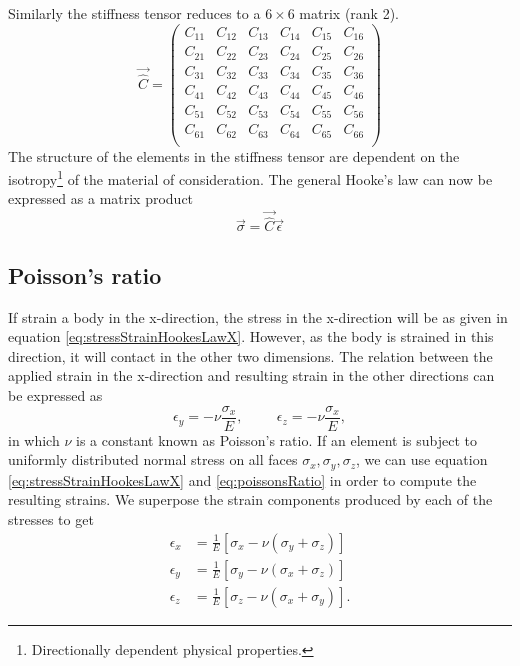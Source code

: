 \documentclass[twoside,english]{uiofysmaster}
\begin{document}
Similarly the stiffness tensor reduces to a $6\times6$ matrix (rank 2).
\begin{equation}
\vec{\hat{C}} = \begin{pmatrix}
C_{11}& C_{12}& C_{13}& C_{14}& C_{15}& C_{16} \\
C_{21}& C_{22}& C_{23}& C_{24}& C_{25}& C_{26} \\
C_{31}& C_{32}& C_{33}& C_{34}& C_{35}& C_{36} \\
C_{41}& C_{42}& C_{43}& C_{44}& C_{45}& C_{46} \\
C_{51}& C_{52}& C_{53}& C_{54}& C_{55}& C_{56} \\
C_{61}& C_{62}& C_{63}& C_{64}& C_{65}& C_{66} \\
\end{pmatrix}
\end{equation} 
The structure of the elements in the stiffness tensor are dependent on the isotropy\footnote{Directionally dependent physical properties.} of the material of consideration.
The general Hooke's law can now be expressed as a matrix product
\begin{equation}
\vec{\sigma} = \vec{\hat{C}}\vec{\epsilon}
\end{equation}

\subsection{Poisson's ratio}
If strain a body in the x-direction, the stress in the x-direction will be as given in equation \eqref{eq:stressStrainHookesLawX}. However, as the body is strained in this direction, it will contact in the other two dimensions. 
The relation between the applied strain in the x-direction and resulting strain in the other directions can be expressed as 
\begin{equation}
\epsilon_y = -\nu\frac{\sigma_x}{E}, \hspace{1cm} \epsilon_z = -\nu\frac{\sigma_x}{E} , \label{eq:poissonsRatio}
\end{equation}
in which $\nu$ is a constant known as Poisson's ratio. 
If an element is subject to uniformly distributed normal stress on all faces $\sigma_x,\sigma_y,\sigma_z$, we can use equation \eqref{eq:stressStrainHookesLawX} and \eqref{eq:poissonsRatio} in order to compute the resulting strains. 
We superpose the strain components produced by each of the stresses to get
\begin{align}
\epsilon_x &= \frac{1}{E}[\sigma_x - \nu(\sigma_y + \sigma_z)]\\[2mm]
\epsilon_y &= \frac{1}{E}[\sigma_y - \nu(\sigma_x + \sigma_z)]\\[2mm]
\epsilon_z &= \frac{1}{E}[\sigma_z - \nu(\sigma_x + \sigma_y)].
\end{align}
\end{document}
